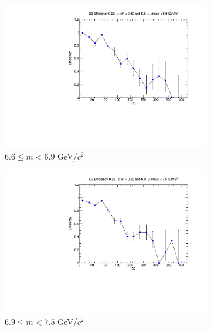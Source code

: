 \documentclass[11pt]{article}
\begin{document}
\begin{figure}[p]
\begin{subfigure}[b]{0.32\textwidth}
        \includegraphics[width=\textwidth]{./kTrackerEfficiencyPlots/D2_Efficiency_xF5_mass8.pdf}
        \caption{$6.6 \leq m < 6.9$ GeV/$c^2$}
    \end{subfigure}\vspace{0.5cm}
    \begin{subfigure}[b]{0.32\textwidth}
        \centering
        \includegraphics[width=\textwidth]{./kTrackerEfficiencyPlots/D2_Efficiency_xF5_mass9.pdf}
        \caption{$6.9 \leq m < 7.5$ GeV/$c^2$}
    \end{subfigure}\hfill
    \begin{subfigure}[b]{0.32\textwidth}
        \centering

\end{subfigure}
\end{figure}
\end{document}

